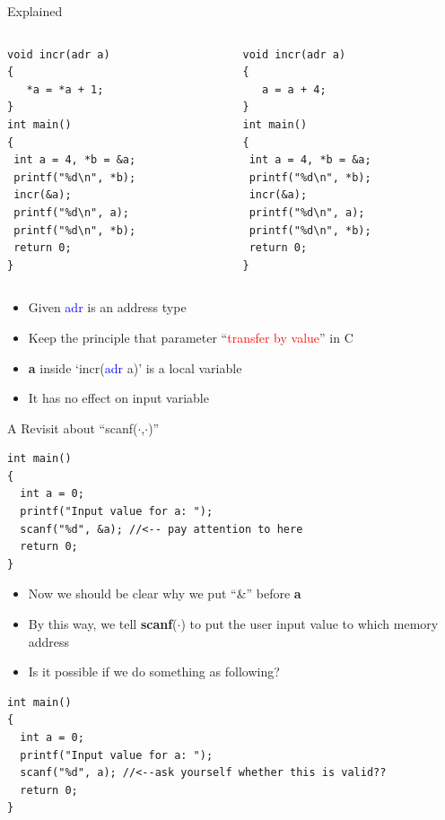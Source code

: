\begin{frame}[fragile]{Explained}
\vspace{-0.15in}
\begin{columns}
\begin{column}{0.4\linewidth}
\begin{lstlisting}
void incr(adr a)
{
   *a = *a + 1;
}
int main()
{
 int a = 4, *b = &a;
 printf("%d\n", *b);
 incr(&a);
 printf("%d\n", a);
 printf("%d\n", *b);
 return 0;
}
\end{lstlisting}
\end{column}
\begin{column}{0.45\linewidth}
\begin{lstlisting}
void incr(adr a)
{
   a = a + 4;
}
int main()
{
 int a = 4, *b = &a;
 printf("%d\n", *b);
 incr(&a);
 printf("%d\n", a);
 printf("%d\n", *b);
 return 0;
}
\end{lstlisting}
\end{column}
\end{columns}
\begin{itemize}
	\item {Given \textcolor{blue}{adr} is an address type}
    \item {Keep the principle that parameter ``\textcolor{red}{transfer by value}'' in C}
    \item {\textbf{a} inside `incr(\textcolor{blue}{adr} a)' is a local variable}
    \item {It has no effect on input variable}
\end{itemize}
\end{frame}

\begin{frame}[fragile]{A Revisit about ``scanf($\cdot$,$\cdot$)''}
\vspace{-0.10in}
\begin{lstlisting}[xleftmargin=0.08\linewidth, linewidth=0.9\linewidth]
int main()
{
  int a = 0;
  printf("Input value for a: ");
  scanf("%d", &a); //<-- pay attention to here
  return 0;
}
\end{lstlisting}
\vspace{-0.15in}
\begin{itemize}
	\item {Now we should be clear why we put ``\&'' before \textbf{a}}
	\item {By this way, we tell \textbf{scanf}($\cdot$) to put the user input value to which memory address}
	\item {Is it possible if we do something as following?}
\end{itemize}
\begin{lstlisting}[xleftmargin=0.01\linewidth, linewidth=0.99\linewidth]
int main()
{
  int a = 0;
  printf("Input value for a: ");
  scanf("%d", a); //<--ask yourself whether this is valid??
  return 0;
}
\end{lstlisting}
\end{frame}